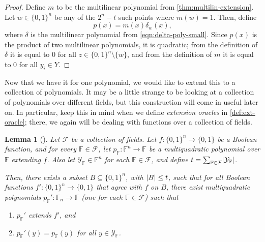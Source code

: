 \documentclass[english,12pt]{reedthesis}
\theoremstyle{plain}
\newtheorem{lemma}[lemma]{Lemma}
\theoremstyle{definition}
\theoremstyle{remark}
\DeclarePairedDelimiter{\abs}{\lvert}{\rvert}
\begin{document}
\begin{proof}
  Define $m$ to be the multilinear polynomial from
  \cref{thm:multilin-extension}. Let $w \in \{0, 1\}^{n}$ be any of the
  $2^{n} - t$ such points where $m(w) = 1$. Then, define
  \begin{equation}
    p(x) = m(x)\delta_{w}(x),
  \end{equation}
  where $\delta$ is the multilinear polynomial from \cref{eqn:delta-poly-small}.
  Since $p(x)$ is the product of two multilinear polynomials, it is quadratic;
  from the definition of $\delta$ it is equal to $0$ for all
  $z \in \{0, 1\}^{n} \setminus \{w\}$, and from the definition of $m$ it is equal to $0$
  for all $y_{i} \in Y$.
\end{proof}

Now that we have it for one polynomial, we would like to extend this to a
collection of polynomials. It may be a little strange to be looking at a
collection of polynomials over different fields, but this construction will come
in useful later on. In particular, keep this in mind when we define
\emph{extension oracles} in \cref{def:ext-oracle}; there, we again will be
dealing with functions over a collection of fields.

\begin{lemma}[{\cite[Lemma 4.5]{AW09}}]\label{lem:multiquad-adversary}
  Let $\mathcal{F}$ be a collection of fields. Let $f\colon \{0, 1\}^{n} \rightarrow \{0, 1\}$ be a
  Boolean function, and for every $\mathbb{F} \in \mathcal{F}$, let
  $p_{\mathbb{F}}\colon \mathbb{F}^{n} \rightarrow \mathbb{F}$ be a multiquadratic
  polynomial over $\mathbb{F}$ extending $f$. Also let
  $\mathcal{Y}_{\mathbb{F}} \in \mathbb{F}^{n}$ for each $\mathbb{F} \in \mathcal{F}$, and define
  $t = \sum_{\mathbb{F} \in \mathcal{F}}\abs{\mathcal{Y}_{\mathbb{F}}}$.

  Then, there exists a subset $B \subseteq \{0, 1\}^{n}$, with $\abs{B} \le t$, such that
  for all Boolean functions $f'\colon \{0, 1\}^{n} \rightarrow \{0, 1\}$ that agree with
  $f$ on $B$, there exist multiquadratic polynomials
  $p_{\mathbb{F}}'\colon \mathbb{F}_{n} \rightarrow \mathbb{F}$ (one for each
  $\mathbb{F} \in \mathcal{F}$) such that
  \begin{enumerate}
    \item $p_{\mathbb{F}}'$ extends $f'$, and
    \item $p_{\mathbb{F}}'(y) = p_{\mathbb{F}}(y)$ for all $y \in \mathcal{Y}_{\mathbb{F}}$.
  \end{enumerate}
\end{lemma}
\end{document}
